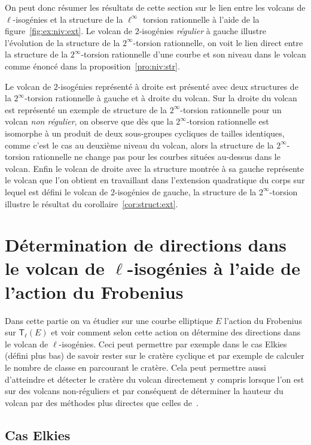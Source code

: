 \documentclass[10pt,a4paper]{book}
\theoremstyle{plain}
\theoremstyle{definition}
\theoremstyle{definition}
\theoremstyle{definition}
\theoremstyle{definition}
\theoremstyle{remark}
\theoremstyle{remark}
\theoremstyle{definition}
\begin{document}
On peut donc résumer les résultats de cette section sur le lien entre les 
volcans de $\ell$-isogénies et la structure de la $\ell^{\infty}$ torsion 
rationnelle à l'aide de la figure~\ref{fig:ex:niv:ext}. Le volcan de 
$2$-isogénies \emph{régulier} à gauche illustre l'évolution de la structure de
la $2^{\infty}$-torsion rationnelle, on voit le lien direct entre la 
structure de la $2^{\infty}$-torsion rationnelle d'une courbe et son niveau 
dans le volcan comme énoncé dans la proposition~\ref{pro:niv:str}. 

Le volcan de $2$-isogénies représenté à droite est présenté avec deux
structures de la $2^{\infty}$-torsion rationnelle à gauche et à droite du 
volcan. Sur la droite du volcan est représenté un exemple de structure de la 
$2^{\infty}$-torsion rationnelle pour un volcan \emph{non régulier}, on observe
que dès que la $2^{\infty}$-torsion rationnelle est isomorphe à un produit de 
deux sous-groupes cycliques de tailles identiques, comme c'est le cas au 
deuxième niveau du volcan, alors la structure de la $2^{\infty}$-torsion 
rationnelle ne change pas pour les courbes situées au-dessus dans le volcan. 
Enfin le volcan de droite avec la structure montrée à sa gauche représente le 
volcan que l'on obtient en travaillant dans l'extension quadratique du corps 
sur lequel est défini le volcan de $2$-isogénies de gauche, la structure de 
la $2^{\infty}$-torsion illustre le résultat du corollaire~\ref{cor:struct:ext}.

\chapter{Détermination de directions dans le volcan de $\ell$-isogénies à l'aide de l'action du Frobenius}
\label{cha:act:fro}
Dans cette partie on va étudier sur une courbe elliptique $E$ l'action du 
Frobenius sur $\mathsf{T}_{\ell}(E)$ et voir comment selon cette action on 
détermine des directions dans le volcan de $\ell$-isogénies.  Ceci peut permettre par exemple dans le cas Elkies (défini 
plus bas) de savoir rester sur le cratère cyclique et par exemple de calculer
le nombre de classe en parcourant le cratère. Cela peut permettre aussi d'atteindre et 
détecter le cratère du volcan directement y compris lorsque l'on est sur des 
volcans non-réguliers et par conséquent de déterminer la hauteur du volcan par
des méthodes plus directes que celles de~\cite{FouquetMorain02}.

\section{Cas Elkies}
\end{document}
